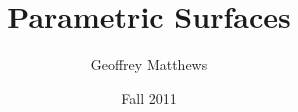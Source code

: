 \documentclass[slidestop,xcolor=pst]{beamer}
\title[Parametric Surfaces]
{
Parametric Surfaces
}
\subtitle{} %
\author[Geoffrey Matthews]
{Geoffrey Matthews}
\institute[WWU/CS]
{
  Department of Computer Science\\
  Western Washington University
}
\date{Fall 2011}
\begin{document}
\begin{frame}
  \titlepage
\end{frame}

\newcommand{\myref}[1]{\small\item\url{#1}}
\newcommand{\myreff}[1]{\scriptsize\item\url{#1}}


\newcommand{\myframe}[4]{
\pstThreeDLine[arrows=->](#1)(#2)
\pstThreeDLine[arrows=->](#1)(#3)
\pstThreeDLine[arrows=->](#1)(#4)
}

\newcommand{\vtwo}[2]{
\left[\begin{array}{c} #1 \\ #2\end{array}\right]
}
\newcommand{\mtwo}[4]{
\left[\begin{array}{cc} #1 & #2 \\ #3 & #4\end{array}\right]
}
\newcommand{\vthree}[3]{
\left[\begin{array}{c} #1 \\ #2 \\ #3\end{array}\right]
}
\newcommand{\mthree}[9]{
\left[\begin{array}{ccc} #1&#2&#3\\#4&#5&#6\\#7&#8&#9\end{array}\right]
}
\newcommand{\vhomo}[1]{
\left[\begin{array}{c} #1 \\ 0\end{array}\right]
}
\newcommand{\phomo}[1]{
\left[\begin{array}{c} #1 \\ 1\end{array}\right]
}
\newcommand{\whomo}[1]{
\left[\begin{array}{c} #1 \end{array}\right]
}

\newcommand{\mhomo}[3]{
\left[\begin{array}{cccc} #1 \\ #2 \\ #3 \\0&0&0&1\end{array}\right]
}
\newcommand{\wmhomo}[4]{
\left[\begin{array}{cccc} #1 \\ #2 \\ #3 \\ #4\end{array}\right]
}
\end{document}
